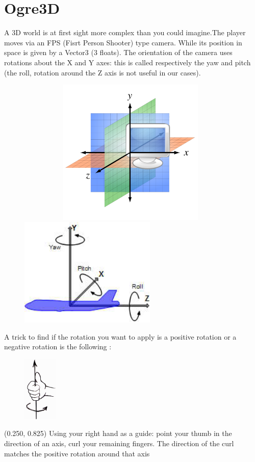 \documentclass[article]{report} %
\begin{document}
			\section{Ogre3D}
				A 3D world is at first sight more complex than you could imagine.The player moves via an FPS (Fisrt Person Shooter) type camera. While its position in space is given by a Vector3 (3 floats). The orientation of the camera uses rotations about the X and Y axes: this is called respectively the yaw and pitch (the roll, rotation around the Z axis is not useful in our cases).
			\begin{figure}[h]
				\includegraphics[width=11cm,   height=7cm]{Images/axis.png}
				\includegraphics[width=6.5cm]{Images/Rotations.jpeg}
			\end{figure}
			
			A trick to find if the rotation you want to apply is a positive rotation or a negative rotation is the following : \\
			\begin{figure}[h]
				\includegraphics[]{Images/RotationsPositive.png}
			\end{figure}
			\begin{textblock}{0.628}(0.250, 0.825)
							\noindent  Using your right hand as a guide: point your thumb in the direction of an axis, curl your remaining fingers. The direction of the curl matches the positive rotation around that axis
						\end{textblock}
\end{document}
